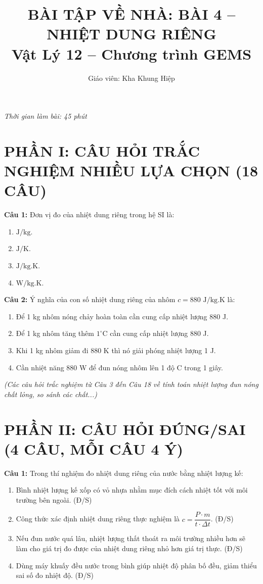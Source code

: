 \documentclass[12pt,a4paper]{article}
\title{\textbf{BÀI TẬP VỀ NHÀ: BÀI 4 -- NHIỆT DUNG RIÊNG}\\
\large Vật Lý 12 -- Chương trình GEMS}
\author{Giáo viên: Kha Khung Hiệp}
\date{}
\begin{document}
\maketitle
\textit{Thời gian làm bài: 45 phút}

\section*{PHẦN I: CÂU HỎI TRẮC NGHIỆM NHIỀU LỰA CHỌN (18 CÂU)}

\textbf{Câu 1:} Đơn vị đo của nhiệt dung riêng trong hệ SI là:
\begin{enumerate}[label=\Alph*.]
  \item $\text{J/kg}$.
  \item $\text{J/K}$.
  \item $\text{J/kg.K}$.
  \item $\text{W/kg.K}$.
\end{enumerate}

\textbf{Câu 2:} Ý nghĩa của con số nhiệt dung riêng của nhôm $c = 880\text{ J/kg.K}$ là:
\begin{enumerate}[label=\Alph*.]
  \item Để 1 kg nhôm nóng chảy hoàn toàn cần cung cấp nhiệt lượng 880 J.
  \item Để 1 kg nhôm tăng thêm $1^{\circ}\text{C}$ cần cung cấp nhiệt lượng 880 J.
  \item Khi 1 kg nhôm giảm đi 880 K thì nó giải phóng nhiệt lượng 1 J.
  \item Cần nhiệt năng 880 W để đun nóng nhôm lên 1 độ C trong 1 giây.
\end{enumerate}

\textit{(Các câu hỏi trắc nghiệm từ Câu 3 đến Câu 18 về tính toán nhiệt lượng đun nóng chất lỏng, so sánh các chất...)}

\section*{PHẦN II: CÂU HỎI ĐÚNG/SAI (4 CÂU, MỖI CÂU 4 Ý)}

\textbf{Câu 1:} Trong thí nghiệm đo nhiệt dung riêng của nước bằng nhiệt lượng kế:
\begin{enumerate}[label=\alph*)]
  \item Bình nhiệt lượng kế xốp có vỏ nhựa nhằm mục đích cách nhiệt tốt với môi trường bên ngoài. (Đ/S)
  \item Công thức xác định nhiệt dung riêng thực nghiệm là $c = \dfrac{P \cdot m}{t \cdot \Delta t}$. (Đ/S)
  \item Nếu đun nước quá lâu, nhiệt lượng thất thoát ra môi trường nhiều hơn sẽ làm cho giá trị đo được của nhiệt dung riêng nhỏ hơn giá trị thực. (Đ/S)
  \item Dùng máy khuấy đều nước trong bình giúp nhiệt độ phân bố đều, giảm thiểu sai số đo nhiệt độ. (Đ/S)
\end{enumerate}
\end{document}

